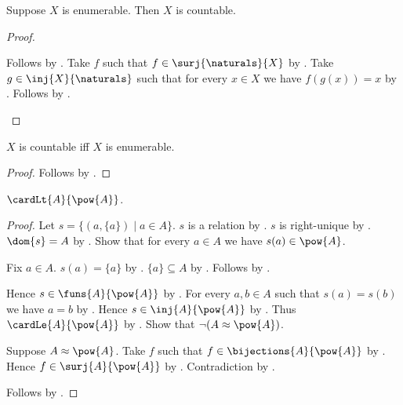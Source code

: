 \begin{theorem}\label{enumerable_implies_countable}
    Suppose $X$ is enumerable.
    Then $X$ is countable.
\end{theorem}
\begin{proof}
    \begin{byCase}
            Follows by .
            Take $f$ such that $f\in\surj{\naturals}{X}$ by .
            Take $g\in\inj{X}{\naturals}$ such that for every $x\in X$
                we have $f(g(x))=x$
                by .
            Follows by .
    \end{byCase}
\end{proof}

\begin{theorem}\label{countable_iff_enumerable}
    $X$ is countable iff $X$ is enumerable.
\end{theorem}
\begin{proof}
    Follows by
        .
\end{proof}

\begin{theorem}\label{cantor_strict_cardinality}
    $\cardLt{A}{\pow{A}}$.
\end{theorem}
\begin{proof}
    Let $s=\{(a,\{a\})\mid a\in A\}$.
    $s$ is a relation by .
    $s$ is right-unique by .
    $\dom{s}=A$ by .
    Show that for every $a\in A$ we have $s(a)\in\pow{A}$.
    \begin{subproof}
        Fix $a\in A$.
        $s(a)=\{a\}$ by .
        $\{a\}\subseteq A$ by .
        Follows by .
    \end{subproof}
    Hence $s\in\funs{A}{\pow{A}}$ by .
    For every $a,b\in A$ such that $s(a)=s(b)$ we have $a=b$
        by .
    Hence $s\in\inj{A}{\pow{A}}$ by .
    Thus $\cardLe{A}{\pow{A}}$ by .
    Show that $\lnot(A\approx\pow{A})$.
    \begin{subproof}
        Suppose $A\approx\pow{A}$.
        Take $f$ such that $f\in\bijections{A}{\pow{A}}$ by .
        Hence $f\in\surj{A}{\pow{A}}$ by .
        Contradiction by .
    \end{subproof}
    Follows by .
\end{proof}
